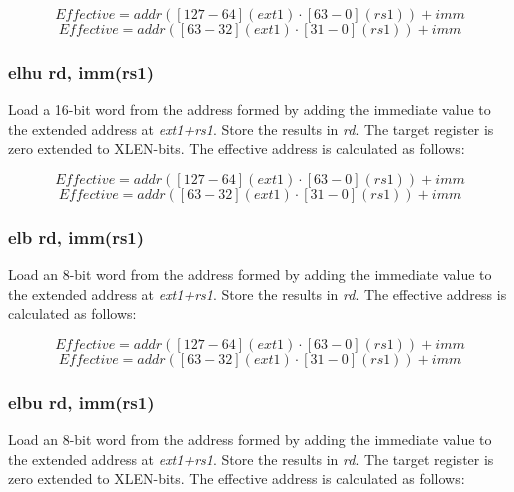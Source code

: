 \documentclass{article}
\begin{document}
\begin{equation}
Effective = addr([127-64](ext1) \cdot [63-0](rs1))+imm
\end{equation}
\begin{equation}
Effective = addr([63-32](ext1) \cdot [31-0](rs1))+imm
\end{equation}

\subsubsection{elhu rd, imm(rs1)}
Load a 16-bit word from the address formed by adding the immediate value to the 
extended address at \textit{ext1+rs1}.  Store the results in \textit{rd}.  
 The target register is zero extended to XLEN-bits.  The effective 
address is calculated as follows: 

\begin{equation}
Effective = addr([127-64](ext1) \cdot [63-0](rs1))+imm
\end{equation}
\begin{equation}
Effective = addr([63-32](ext1) \cdot [31-0](rs1))+imm
\end{equation}

\subsubsection{elb rd, imm(rs1)}
Load an 8-bit word from the address formed by adding the immediate value to the 
extended address at \textit{ext1+rs1}.  Store the results in \textit{rd}.  The effective 
address is calculated as follows: 

\begin{equation}
Effective = addr([127-64](ext1) \cdot [63-0](rs1))+imm
\end{equation}
\begin{equation}
Effective = addr([63-32](ext1) \cdot [31-0](rs1))+imm
\end{equation}

\subsubsection{elbu rd, imm(rs1)}
Load an 8-bit word from the address formed by adding the immediate value to the 
extended address at \textit{ext1+rs1}.  Store the results in \textit{rd}.  
 The target register is zero extended to XLEN-bits.  The effective 
address is calculated as follows: 
\end{document}
